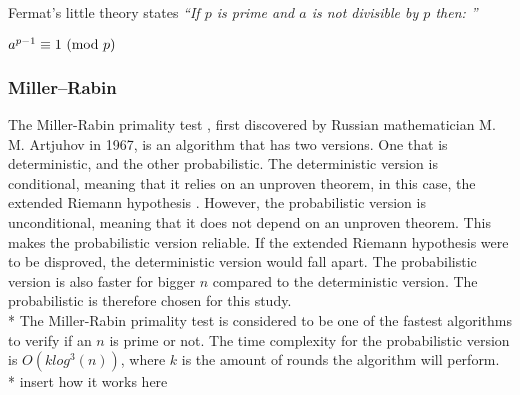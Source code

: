 \documentclass[main.tex]{subfiles}
\begin{document}
Fermat's little theory \cite{fermat:little} states \textit{``If $p$ is prime and
  $a$ is not divisible by $p$ then: ''}

\begin{mdframed}
  \centering $a^{p - 1} \equiv 1 \ (\mathrm{mod}\ p)$
\end{mdframed}

\subsubsection{Miller–Rabin}
The Miller-Rabin primality test \cite{algh:miller}, first discovered by Russian
mathematician M. M. Artjuhov in 1967, is an algorithm that has two versions. One
that is deterministic, and the other probabilistic. The deterministic version is
conditional, meaning that it relies on an unproven theorem, in this case, the
extended Riemann hypothesis \cite{riemann}. However, the probabilistic version
is unconditional, meaning that it does not depend on an unproven theorem. This
makes the probabilistic version reliable. If the extended Riemann hypothesis
were to be disproved, the deterministic version would fall apart. The
probabilistic version is also faster for bigger $n$ compared to the
deterministic version. The probabilistic is therefore chosen for this study.
\newline
\\*
The Miller-Rabin primality test is considered to be one of the fastest
algorithms to verify if an $n$ is prime or not. The time complexity for the
probabilistic version is $O(k log^{3}(n))$, where $k$ is the amount of rounds
the algorithm will perform. \newline
\\*
insert how it works here
\end{document}
